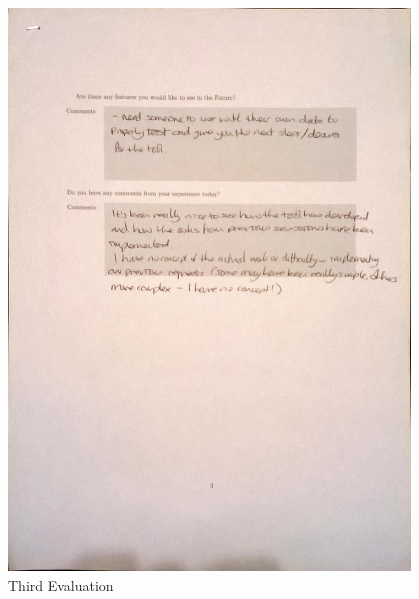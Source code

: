 \begin{figure}[h!]
    \centering
    \includegraphics[width=0.95\textwidth]{images/user_eval/user_eval_20.jpg}
    \caption{Third Evaluation}
\end{figure}

